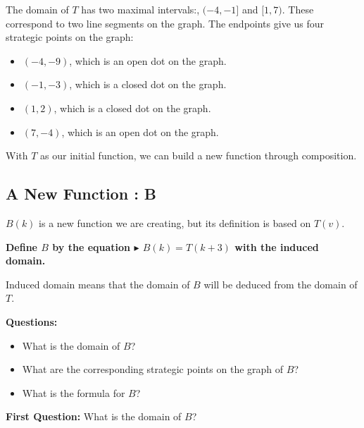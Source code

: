 \documentclass{ximera}
\begin{document}
The domain of $T$ has two maximal intervals:, $(-4,-1]$ and $[1,7)$.  These correspond to two line segments on the graph. The endpoints give us four strategic points on the graph: 

\begin{itemize}

\item $(-4, -9)$, which is an open dot on the graph.
\item $(-1, -3)$, which is a closed dot on the graph.
\item $(1, 2)$, which is a closed dot on the graph.
\item $(7, -4)$, which is an open dot on the graph.

\end{itemize}






With $T$ as our initial function, we can build a new function through composition.











\subsection*{A New Function : B}

$B(k)$ is a new function we are creating, but its definition is based on $T(v)$.


\textbf{Define $B$ by the equation \textcolor{blue!55!black}{$\blacktriangleright$ $B(k) = T(k+3)$} with the induced domain.}


Induced domain means that the domain of $B$ will be deduced from the domain of $T$.


\textbf{Questions:} 
\begin{itemize}
  \item What is the domain of $B$?
  \item What are the corresponding strategic points on the graph of $B$?
  \item What is the formula for $B$?
\end{itemize}



\textbf{\textcolor{purple!85!blue}{First Question:}}   What is the domain of $B$?
\end{document}

